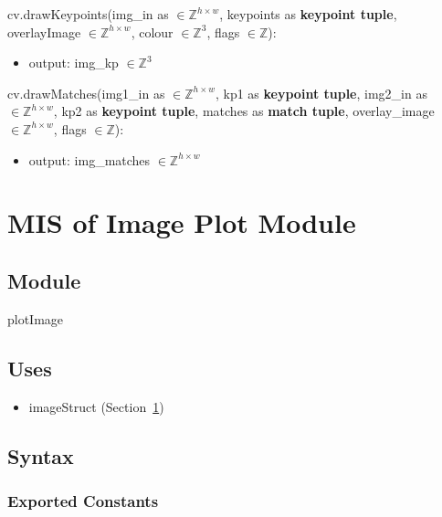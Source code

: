 \documentclass[12pt, titlepage]{article}
\begin{document}
\noindent cv.drawKeypoints(img\_in as $\in \mathbb{Z}^{h \times w}$, 
keypoints as \textbf{keypoint tuple}, overlayImage $\in \mathbb{Z}^{h \times w}$,
colour $\in \mathbb{Z}^{3}$, flags $\in \mathbb{Z}$):
\begin{itemize}
\item output: img\_kp $\in \mathbb{Z}^{3}$
\end{itemize}

\noindent cv.drawMatches(img1\_in as $\in \mathbb{Z}^{h \times w}$, 
kp1 as \textbf{keypoint tuple}, img2\_in as $\in \mathbb{Z}^{h \times w}$, 
kp2 as \textbf{keypoint tuple}, matches as \textbf{match tuple}, overlay\_image $\in \mathbb{Z}^{h \times w}$,
flags $\in \mathbb{Z}$):
\begin{itemize}
\item output: img\_matches $\in \mathbb{Z}^{h\times w}$
\end{itemize}



\section{MIS of Image Plot Module} \label{mIP}
\subsection{Module}
plotImage

\subsection{Uses}
\begin{itemize}
  \item imageStruct (Section~\ref{mIP})
\end{itemize}

\subsection{Syntax}
\subsubsection{Exported Constants}
\end{document}
